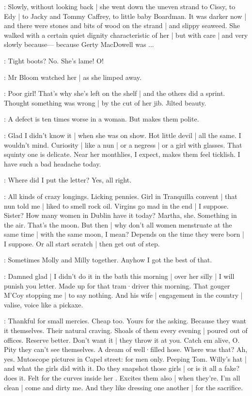 :
Slowly,
without looking back |
she went down the uneven strand to Cissy,
to Edy |
to Jacky and Tommy Caffrey,
to little baby Boardman.
It was darker now |
and there were stones and bits of wood on the strand |
and slippy seaweed.
She walked with a certain quiet dignity characteristic of her |
but with care |%
and very slowly because—%
because Gerty MacDowell was ...

\BloomInt:
Tight boots?
No.
She's lame!
O!

:
Mr Bloom watched her |
as she limped away.

\BloomCurrent:
Poor girl!
That's why
she's left on the shelf |
and the others did a sprint.
Thought something was wrong |
by the cut of her jib.
Jilted beauty.

\BloomAbstract:
A defect is ten times worse in a woman.
But makes them polite.

\BloomCurrent:
Glad I didn't know it |
when she was on show.
Hot little devil |
all the same.
I wouldn't mind.
Curiosity |
like a nun |
or a negress |
or a girl with glasses.
That squinty one is delicate.
Near her monthlies,
I expect,
makes them feel ticklish.
I have such a bad headache today.

\BloomToday:
Where did I put the letter?
Yes,
all right.

\BloomAbstract:
All kinds of crazy longings.
Licking pennies.%
Girl in Tranquilla convent |
that nun told me |
liked to smell rock oil.
Virgins go mad in the end |
I suppose.
Sister?
How many women in Dublin have it today?
Martha,
she.
Something in the air.
That's the moon.
But then |
why don't all women menstruate
at the same time |
with the same moon,
I mean?
Depends on the time they were born |
I suppose.
Or all start scratch |
then get out of step.

\BloomHist:
Sometimes Molly and Milly together.
Anyhow I got the best of that.

\BloomToday:
Damned glad |
I didn't do it in the bath this morning |
over her silly |
I will punish you letter.
Made up for that tram·driver this morning.
That gouger M'Coy stopping me |
to say nothing.
And his wife |
engagement in the country |
valise,
voice like a pickaxe.

\BloomAbstract:
Thankful for small mercies.
Cheap too.
Yours for the asking.%
Because they want it themselves.
Their natural craving.
Shoals of them every evening |
poured out of offices.
Reserve better.
Don't want it |
they throw it at you.
Catch em alive,
O.
Pity they can't see themselves.
A dream of well·filled hose.
Where was that?
Ah,
yes.
Mutoscope pictures in Capel street:
for men only.
Peeping Tom.
Willy's hat |
and what the girls did with it.
Do they snapshot those girls |
or is it all a fake?
 does it.
Felt for the curves inside her .
Excites them also |
when they're.
I'm all clean |
come and dirty me.
And they like dressing one another |
for the sacrifice.

